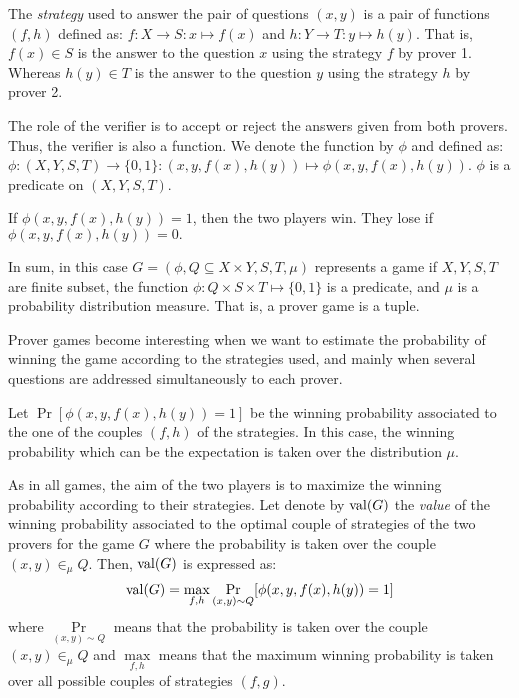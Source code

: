 The \textit{strategy} used to answer 
the pair of questions $(x,y)$
is a pair of functions $(f,h)$ defined as: $f: X \longrightarrow S: x \longmapsto f(x)$ and $h: Y \longrightarrow T: y \longmapsto h(y).$
That is, $f(x) \in S$ is the answer to the question $x$
using the strategy $f$ by prover 1. Whereas $h(y) \in T$ is the answer to the question $y$ using the strategy $h$ by prover 2.

The role of the verifier is to accept or reject the answers given from both provers. Thus, the verifier is also a function. We denote the function  
by $\phi$ and defined as: $\phi: (X,Y,S,T) \longrightarrow \{0,1\}: (x,y,f(x),h(y)) \longmapsto  \phi(x,y,f(x),h(y)).$ $\phi$ is a predicate on  $(X,Y,S,T).$

If $\phi(x,y,f(x),h(y))=1$, then the two players win. They lose if $\phi(x,y,f(x),h(y))=0.$ 

In sum, in this case $G=(\phi, Q\subseteq X \times Y, S,T, \mu)$ represents  a game if $X,Y,S,T$ are finite subset,
the function $\phi: Q\times S \times T  \longmapsto \{0,1\}$ is a predicate, and $\mu$ is a probability distribution measure. That is, a prover game is a tuple.

Prover games become interesting when we want to estimate the probability of winning the game according to the strategies used, and mainly when several questions are addressed simultaneously  to each prover.

Let $\Pr[\phi(x,y,f(x),h(y))=1]$
be the winning probability associated to the one of the couples $(f,h)$ of the strategies. In this case, the winning probability \say{ $\Pr$} which can be the expectation is taken over the distribution $\mu.$

As in all games, the aim of the two players is to maximize the winning probability according to their strategies. Let denote by $\mathrm{val} (G)$ the \textit{value} of the winning probability associated to the optimal couple of strategies of the two provers for the game $G$ where the probability is taken over the couple $(x,y) \in_{\mu} Q$. Then, $\mathrm{val} (G)$ is expressed as: $$\mathrm{val} (G)=\max_{f,h}  \underset{(x,y) \sim Q}\Pr[\phi(x,y,f(x),h(y))=1]$$
where $\underset{(x,y) \sim Q}\Pr$ means that the probability is taken over the couple $(x,y) \in_{\mu} Q$ and $\max\limits_{f,h}$ means that the maximum winning probability  is taken over all possible couples of strategies $(f,g).$

